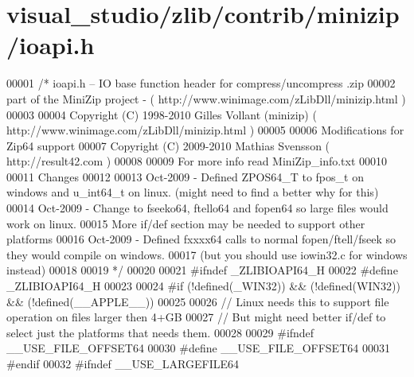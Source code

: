 \hypertarget{visual__studio_2zlib_2contrib_2minizip_2ioapi_8h_source}{}\section{visual\+\_\+studio/zlib/contrib/minizip/ioapi.h}
\label{visual__studio_2zlib_2contrib_2minizip_2ioapi_8h_source}

\begin{DoxyCode}
00001 \textcolor{comment}{/* ioapi.h -- IO base function header for compress/uncompress .zip}
00002 \textcolor{comment}{   part of the MiniZip project - ( http://www.winimage.com/zLibDll/minizip.html )}
00003 \textcolor{comment}{}
00004 \textcolor{comment}{         Copyright (C) 1998-2010 Gilles Vollant (minizip) ( http://www.winimage.com/zLibDll/minizip.html )}
00005 \textcolor{comment}{}
00006 \textcolor{comment}{         Modifications for Zip64 support}
00007 \textcolor{comment}{         Copyright (C) 2009-2010 Mathias Svensson ( http://result42.com )}
00008 \textcolor{comment}{}
00009 \textcolor{comment}{         For more info read MiniZip\_info.txt}
00010 \textcolor{comment}{}
00011 \textcolor{comment}{         Changes}
00012 \textcolor{comment}{}
00013 \textcolor{comment}{    Oct-2009 - Defined ZPOS64\_T to fpos\_t on windows and u\_int64\_t on linux. (might need to find a better
       why for this)}
00014 \textcolor{comment}{    Oct-2009 - Change to fseeko64, ftello64 and fopen64 so large files would work on linux.}
00015 \textcolor{comment}{               More if/def section may be needed to support other platforms}
00016 \textcolor{comment}{    Oct-2009 - Defined fxxxx64 calls to normal fopen/ftell/fseek so they would compile on windows.}
00017 \textcolor{comment}{                          (but you should use iowin32.c for windows instead)}
00018 \textcolor{comment}{}
00019 \textcolor{comment}{*/}
00020 
00021 \textcolor{preprocessor}{#ifndef \_ZLIBIOAPI64\_H}
00022 \textcolor{preprocessor}{#define \_ZLIBIOAPI64\_H}
00023 
00024 \textcolor{preprocessor}{#if (!defined(\_WIN32)) && (!defined(WIN32)) && (!defined(\_\_APPLE\_\_))}
00025 
00026   \textcolor{comment}{// Linux needs this to support file operation on files larger then 4+GB}
00027   \textcolor{comment}{// But might need better if/def to select just the platforms that needs them.}
00028 
00029 \textcolor{preprocessor}{        #ifndef \_\_USE\_FILE\_OFFSET64}
00030 \textcolor{preprocessor}{                #define \_\_USE\_FILE\_OFFSET64}
00031 \textcolor{preprocessor}{        #endif}
00032 \textcolor{preprocessor}{        #ifndef \_\_USE\_LARGEFILE64}

\end{DoxyCode}
